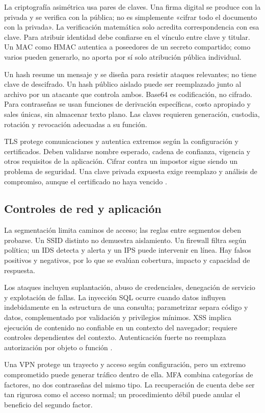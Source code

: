 La criptografía asimétrica usa pares de claves. Una firma digital se produce con la privada y se verifica con la pública; no es simplemente «cifrar todo el documento con la privada». La verificación matemática solo acredita correspondencia con esa clave. Para atribuir identidad debe confiarse en el vínculo entre clave y titular. Un MAC como HMAC autentica a poseedores de un secreto compartido; como varios pueden generarlo, no aporta por sí solo atribución pública individual.

Un hash resume un mensaje y se diseña para resistir ataques relevantes; no tiene clave de descifrado. Un hash público aislado puede ser reemplazado junto al archivo por un atacante que controla ambos. Base64 es codificación, no cifrado. Para contraseñas se usan funciones de derivación específicas, costo apropiado y sales únicas, sin almacenar texto plano. Las claves requieren generación, custodia, rotación y revocación adecuadas a su función.

TLS protege comunicaciones y autentica extremos según la configuración y certificados. Deben validarse nombre esperado, cadena de confianza, vigencia y otros requisitos de la aplicación. Cifrar contra un impostor sigue siendo un problema de seguridad. Una clave privada expuesta exige reemplazo y análisis de compromiso, aunque el certificado no haya vencido \cite[secciones 4 y 7]{tls}.

\subsection{Controles de red y aplicación}
La segmentación limita caminos de acceso; las reglas entre segmentos deben probarse. Un SSID distinto no demuestra aislamiento. Un firewall filtra según política; un IDS detecta y alerta y un IPS puede intervenir en línea. Hay falsos positivos y negativos, por lo que se evalúan cobertura, impacto y capacidad de respuesta.

Los ataques incluyen suplantación, abuso de credenciales, denegación de servicio y explotación de fallas. La inyección SQL ocurre cuando datos influyen indebidamente en la estructura de una consulta; parametrizar separa código y datos, complementado por validación y privilegios mínimos. XSS implica ejecución de contenido no confiable en un contexto del navegador; requiere controles dependientes del contexto. Autenticación fuerte no reemplaza autorización por objeto o función \cite{owasp}.

Una VPN protege un trayecto y acceso según configuración, pero un extremo comprometido puede generar tráfico dentro de ella. MFA combina categorías de factores, no dos contraseñas del mismo tipo. La recuperación de cuenta debe ser tan rigurosa como el acceso normal; un procedimiento débil puede anular el beneficio del segundo factor.

